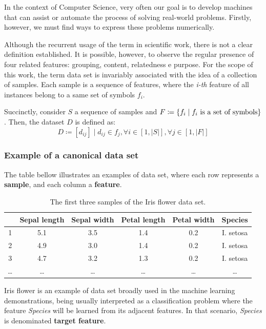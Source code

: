 \documentclass[12pt]{report}
\begin{document}
In the context of Computer Science, very often our goal is to develop machines that can assist or automate the process of solving real-world problems. Firstly, however, we must find ways to express these problems numerically.

Although the recurrent usage of the term in scientific work, there is not a clear definition established. It is possible, however, to observe the regular presence of four related features: grouping, content, relatedness e purpose. \cite{ren2010}
For the scope of this work, the term data set is invariably associated with the idea of a collection of samples. Each sample is a sequence of features, where the {\em i-th} feature of all instances belong to a same set of symbols $f_i$.

Succinctly, consider $S$ a sequence of samples and
$F \coloneqq  \{f_i \mid f_i \textnormal{ is a set of symbols}\}$. Then, the dataset $D$ is defined as:
$$D\coloneqq [d_{ij}] \mid d_{ij} \in f_j, \forall i \in [1, |S|], \forall j \in [1, |F|]$$

\subsubsection{Example of a canonical data set} \label{irisdataset}

The table bellow illustrates an examples of data set, where each row represents a \textbf{sample}, and each column a \textbf{feature}.

\begin{table}[H]
	\begin{tabular}{ c || *{5}{c|}}
		& \textbf{Sepal length} & \textbf{Sepal width} & \textbf{Petal length} & \textbf{Petal width} & \textbf{Species} \\
		\hline
		1 & 5.1	& 3.5 & 1.4 & 0.2 & I. setosa \\
		2 & 4.9 & 3.0 & 1.4 & 0.2 & I. setosa \\
		3 & 4.7 & 3.2 & 1.3 & 0.2 & I. setosa \\
		… & … & … & … & … & … \\
	\end{tabular}
	\caption{The first three samples of the Iris flower data set.}
\end{table}

Iris flower is an example of data set broadly used in the machine learning demonstrations, being usually interpreted as a classification problem where the feature {\em Species} will be learned from its adjacent features. In that scenario, {\em Species} is denominated \textbf{target feature}.
\end{document}
